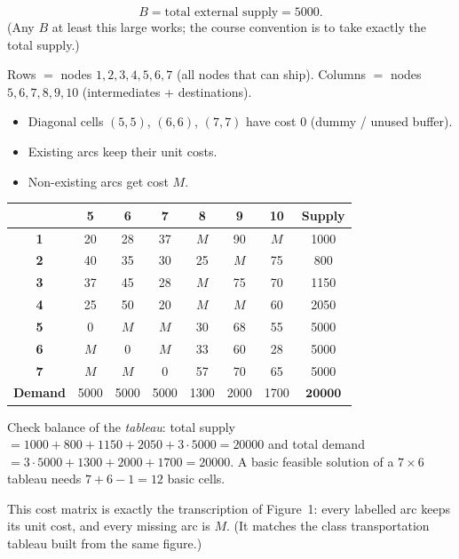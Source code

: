 \[
  B = \text{total external supply} = 5000.
\]
(Any \(B\) at least this large works; the course convention is to take exactly the total supply.)

Rows \(=\) nodes \(1,2,3,4,5,6,7\) (all nodes that can ship).
Columns \(=\) nodes \(5,6,7,8,9,10\) (intermediates + destinations).
\begin{itemize}
  \item Diagonal cells \((5,5)\), \((6,6)\), \((7,7)\) have cost \(0\) (dummy / unused buffer).
  \item Existing arcs keep their unit costs.
  \item Non-existing arcs get cost \(M\).
\end{itemize}

\begin{center}
\renewcommand{\arraystretch}{1.35}
\begin{tabular}{|c|c|c|c|c|c|c|c|}
\hline
 & \textbf{5} & \textbf{6} & \textbf{7} & \textbf{8} & \textbf{9} & \textbf{10} & \textbf{Supply} \\
\hline
\textbf{1} & 20 & 28 & 37 & \(M\) & 90 & \(M\) & 1000 \\
\hline
\textbf{2} & 40 & 35 & 30 & 25 & \(M\) & 75 & 800 \\
\hline
\textbf{3} & 37 & 45 & 28 & \(M\) & 75 & 70 & 1150 \\
\hline
\textbf{4} & 25 & 50 & 20 & \(M\) & \(M\) & 60 & 2050 \\
\hline
\textbf{5} & 0 & \(M\) & \(M\) & 30 & 68 & 55 & 5000 \\
\hline
\textbf{6} & \(M\) & 0 & \(M\) & 33 & 60 & 28 & 5000 \\
\hline
\textbf{7} & \(M\) & \(M\) & 0 & 57 & 70 & 65 & 5000 \\
\hline
\textbf{Demand} & 5000 & 5000 & 5000 & 1300 & 2000 & 1700 & \(\mathbf{20000}\) \\
\hline
\end{tabular}
\end{center}

\begin{warningbox}
Check balance of the \emph{tableau}: total supply \(=1000+800+1150+2050+3\cdot 5000=20000\)
and total demand \(=3\cdot 5000+1300+2000+1700=20000\). A basic feasible solution of a
\(7\times 6\) tableau needs \(7+6-1=12\) basic cells.

This cost matrix is exactly the transcription of Figure~1: every labelled arc keeps its
unit cost, and every missing arc is \(M\). (It matches the class transportation tableau
built from the same figure.)
\end{warningbox}

